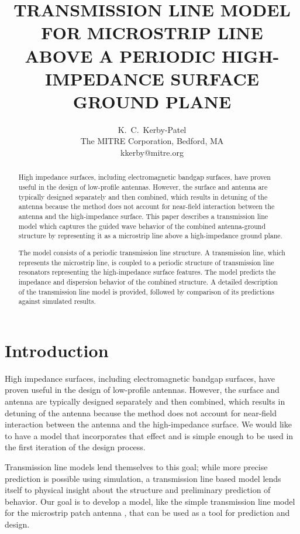 \documentclass{allertonproc}
\begin{document}

\title{ TRANSMISSION LINE MODEL FOR MICROSTRIP LINE ABOVE A
PERIODIC HIGH-IMPEDANCE SURFACE GROUND PLANE}
\author{K.~C.~Kerby-Patel\\The MITRE Corporation, Bedford, MA\\kkerby@mitre.org}
\maketitle
\begin{abstract}
High impedance surfaces, including electromagnetic bandgap surfaces, have proven useful in the design of low-profile antennas. However, the surface and antenna are typically designed separately and then combined, which results in detuning of the antenna because the method does not account for near-field interaction between the antenna and the high-impedance surface. This paper describes a transmission line model which captures the guided wave behavior of the combined antenna-ground structure by representing it as a microstrip line above a high-impedance ground plane.

The model consists of a periodic transmission line structure. A transmission line, which represents the microstrip line, is coupled to a periodic structure of transmission line resonators representing the high-impedance surface features. The model predicts the impedance and dispersion behavior of the combined structure. A detailed description of the transmission line model is provided, followed by comparison of its predictions against simulated results.
\end{abstract}
\section{Introduction}
High impedance surfaces, including electromagnetic bandgap surfaces, have
proven useful in the design of low-profile antennas. However, the surface and antenna
are typically designed separately and then combined, which results in detuning of the
antenna because the method does not account for near-field interaction between the
antenna and the high-impedance surface. We would like to have a model that incorporates that effect and is simple enough to be used in the first iteration of the design process.

Transmission line models lend themselves to this goal; while more precise prediction is possible using simulation, a transmission line based model lends itself to physical insight about the structure and preliminary prediction of behavior.   Our goal is to develop a model, like the simple transmission line model for the microstrip patch antenna \cite{munson}, that can be used as a tool for prediction and design.
\end{document}
